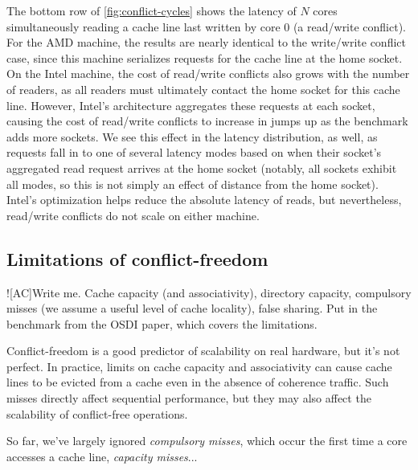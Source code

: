 The bottom row of \cref{fig:conflict-cycles} shows the latency of $N$
cores simultaneously reading a cache line last written by core 0 (a
read/write conflict).  For the AMD machine, the results are nearly
identical to the write/write conflict case, since this machine
serializes requests for the cache line at the home socket.  On the
Intel machine, the cost of read/write conflicts also grows with the
number of readers, as all readers must ultimately contact the home
socket for this cache line.  However, Intel's architecture aggregates
these requests at each socket, causing the cost of read/write
conflicts to increase in jumps up as the benchmark adds more sockets.
We see this effect in the latency distribution, as well, as requests
fall in to one of several latency modes based on when their socket's
aggregated read request arrives at the home socket (notably, all
sockets exhibit all modes, so this is not simply an effect of distance
from the home socket).  Intel's optimization helps reduce the absolute
latency of reads, but nevertheless, read/write conflicts do not scale
on either machine.


\subsection{Limitations of conflict-freedom}
\label{sec:scalability:limits}

\XXX![AC]{Write me.  Cache capacity (and associativity), directory
  capacity, compulsory misses (we assume a useful level of cache
  locality), false sharing.  Put in the benchmark from the OSDI paper,
  which covers the limitations.}

Conflict-freedom is a good predictor of scalability on real hardware,
but it's not perfect.  In practice, limits on cache capacity and
associativity can cause cache lines to be evicted from a cache even in
the absence of coherence traffic.  Such misses directly affect
sequential performance, but they may also affect the scalability of
conflict-free operations.




So far, we've largely ignored \emph{compulsory misses}, which occur
the first time a core accesses a cache line, \emph{capacity misses}...


